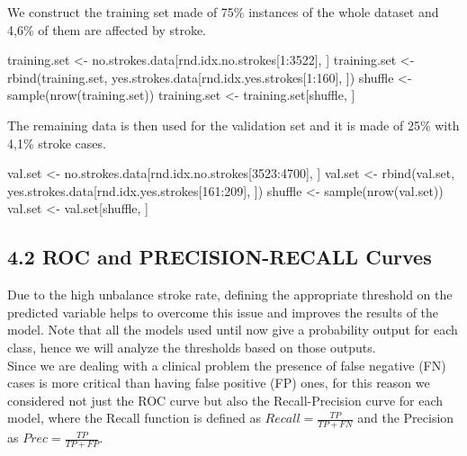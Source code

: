 \documentclass[
]{article}
\newenvironment{Shaded}{\begin{snugshade}}{\end{snugshade}}
\newcommand{\DecValTok}[1]{\textcolor[rgb]{0.00,0.00,0.81}{#1}}
\newcommand{\FunctionTok}[1]{\textcolor[rgb]{0.00,0.00,0.00}{#1}}
\newcommand{\NormalTok}[1]{#1}
\newcommand{\OtherTok}[1]{\textcolor[rgb]{0.56,0.35,0.01}{#1}}
\newcommand{\SpecialCharTok}[1]{\textcolor[rgb]{0.00,0.00,0.00}{#1}}
\begin{document}
We construct the training set made of 75\% instances of the whole
dataset and 4,6\% of them are affected by stroke.

\begin{Shaded}
\begin{Highlighting}[]
\NormalTok{training.set }\OtherTok{\textless{}{-}}\NormalTok{ no.strokes.data[rnd.idx.no.strokes[}\DecValTok{1}\SpecialCharTok{:}\DecValTok{3522}\NormalTok{], ]}
\NormalTok{training.set }\OtherTok{\textless{}{-}} \FunctionTok{rbind}\NormalTok{(training.set, yes.strokes.data[rnd.idx.yes.strokes[}\DecValTok{1}\SpecialCharTok{:}\DecValTok{160}\NormalTok{], ])}
\NormalTok{shuffle }\OtherTok{\textless{}{-}} \FunctionTok{sample}\NormalTok{(}\FunctionTok{nrow}\NormalTok{(training.set))}
\NormalTok{training.set }\OtherTok{\textless{}{-}}\NormalTok{ training.set[shuffle, ]}
\end{Highlighting}
\end{Shaded}

The remaining data is then used for the validation set and it is made of
25\% with 4,1\% stroke cases.

\begin{Shaded}
\begin{Highlighting}[]
\NormalTok{val.set }\OtherTok{\textless{}{-}}\NormalTok{ no.strokes.data[rnd.idx.no.strokes[}\DecValTok{3523}\SpecialCharTok{:}\DecValTok{4700}\NormalTok{], ]}
\NormalTok{val.set }\OtherTok{\textless{}{-}} \FunctionTok{rbind}\NormalTok{(val.set, yes.strokes.data[rnd.idx.yes.strokes[}\DecValTok{161}\SpecialCharTok{:}\DecValTok{209}\NormalTok{], ])}
\NormalTok{shuffle }\OtherTok{\textless{}{-}} \FunctionTok{sample}\NormalTok{(}\FunctionTok{nrow}\NormalTok{(val.set)) }
\NormalTok{val.set }\OtherTok{\textless{}{-}}\NormalTok{ val.set[shuffle, ]}
\end{Highlighting}
\end{Shaded}

\hypertarget{roc-and-precision-recall-curves}{%
\subsection{4.2 ROC and PRECISION-RECALL
Curves}\label{roc-and-precision-recall-curves}}

Due to the high unbalance stroke rate, defining the appropriate
threshold on the predicted variable helps to overcome this issue and
improves the results of the model. Note that all the models used until
now give a probability output for each class, hence we will analyze the
thresholds based on those outputs.\\
Since we are dealing with a clinical problem the presence of false
negative (FN) cases is more critical than having false positive (FP)
ones, for this reason we considered not just the ROC curve but also the
Recall-Precision curve for each model, where the Recall function is
defined as \(Recall = \frac{TP}{TP + FN}\) and the Precision as
\(Prec= \frac{TP}{TP + FP}\).
\end{document}
